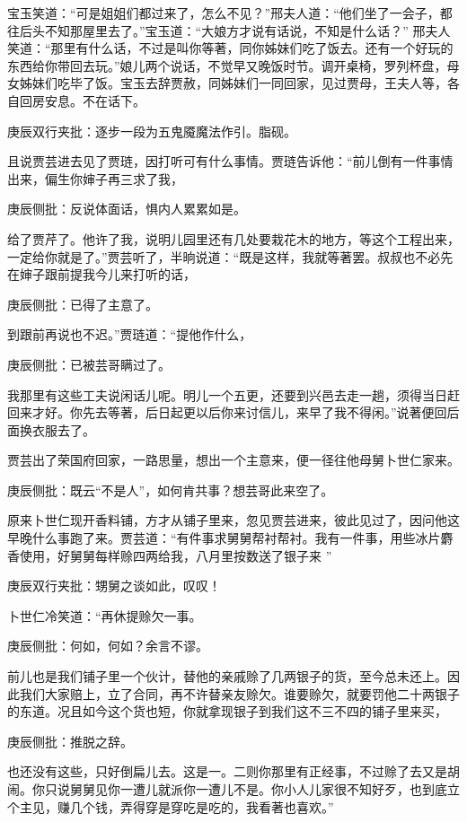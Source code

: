 \begin{parag}


    宝玉笑道：“可是姐姐们都过来了，怎么不见？”邢夫人道：“他们坐了一会子，都往后头不知那屋里去了。”宝玉道：“大娘方才说有话说，不知是什么话？” 邢夫人笑道：“那里有什么话，不过是叫你等著，同你姊妹们吃了饭去。还有一个好玩的东西给你带回去玩。”娘儿两个说话，不觉早又晚饭时节。调开桌椅，罗列杯盘，母女姊妹们吃毕了饭。宝玉去辞贾赦，同姊妹们一同回家，见过贾母，王夫人等，各自回房安息。不在话下。\begin{note}庚辰双行夹批：逐步一段为五鬼魇魔法作引。脂砚。\end{note}
\end{parag}


\begin{parag}


    且说贾芸进去见了贾琏，因打听可有什么事情。贾琏告诉他：“前儿倒有一件事情出来，偏生你婶子再三求了我，\begin{note}庚辰侧批：反说体面话，惧内人累累如是。\end{note}给了贾芹了。他许了我，说明儿园里还有几处要栽花木的地方，等这个工程出来，一定给你就是了。”贾芸听了，半晌说道：“既是这样，我就等著罢。叔叔也不必先在婶子跟前提我今儿来打听的话，\begin{note}庚辰侧批：已得了主意了。\end{note}到跟前再说也不迟。”贾琏道：“提他作什么，\begin{note}庚辰侧批：已被芸哥瞒过了。\end{note}我那里有这些工夫说闲话儿呢。明儿一个五更，还要到兴邑去走一趟，须得当日赶回来才好。你先去等著，后日起更以后你来讨信儿，来早了我不得闲。”说著便回后面换衣服去了。
\end{parag}


\begin{parag}


    贾芸出了荣国府回家，一路思量，想出一个主意来，便一径往他母舅卜世仁家来。\begin{note}庚辰侧批：既云“不是人”，如何肯共事？想芸哥此来空了。\end{note}原来卜世仁现开香料铺，方才从铺子里来，忽见贾芸进来，彼此见过了，因问他这早晚什么事跑了来。贾芸道：“有件事求舅舅帮衬帮衬。我有一件事，用些冰片麝香使用，好舅舅每样赊四两给我，八月里按数送了银子来 ”\begin{note}庚辰双行夹批：甥舅之谈如此，叹叹！\end{note}卜世仁冷笑道：“再休提赊欠一事。\begin{note}庚辰侧批：何如，何如？余言不谬。\end{note}前儿也是我们铺子里一个伙计，替他的亲戚赊了几两银子的货，至今总未还上。因此我们大家赔上，立了合同，再不许替亲友赊欠。谁要赊欠，就要罚他二十两银子的东道。况且如今这个货也短，你就拿现银子到我们这不三不四的铺子里来买，\begin{note}庚辰侧批：推脱之辞。\end{note}也还没有这些，只好倒扁儿去。这是一。二则你那里有正经事，不过赊了去又是胡闹。你只说舅舅见你一遭儿就派你一遭儿不是。你小人儿家很不知好歹，也到底立个主见，赚几个钱，弄得穿是穿吃是吃的，我看著也喜欢。”
\end{parag}


